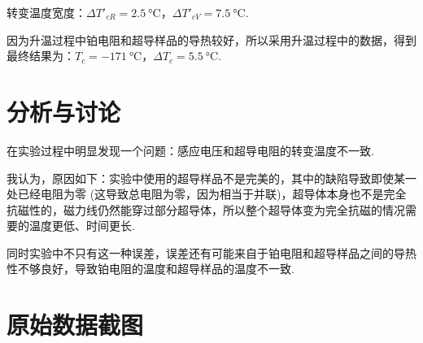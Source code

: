 \documentclass{THUexprep}
\begin{document}
转变温度宽度：$\Delta T'_{cR} = \SI{2.5}{\celsius}$，$\Delta T'_{cV}=\SI{7.5}{\celsius}$.

因为升温过程中铂电阻和超导样品的导热较好，所以采用升温过程中的数据，得到最终结果为：$T_c=\SI{-171}{\celsius}$，$\Delta T_c=\SI{5.5}{\celsius}$.

\section{分析与讨论}

在实验过程中明显发现一个问题：感应电压和超导电阻的转变温度不一致.

我认为，原因如下：实验中使用的超导样品不是完美的，其中的缺陷导致即使某一处已经电阻为零 (这导致总电阻为零，因为相当于并联)，超导体本身也不是完全抗磁性的，磁力线仍然能穿过部分超导体，所以整个超导体变为完全抗磁的情况需要的温度更低、时间更长.

同时实验中不只有这一种误差，误差还有可能来自于铂电阻和超导样品之间的导热性不够良好，导致铂电阻的温度和超导样品的温度不一致.

\section{原始数据截图}
\end{document}

